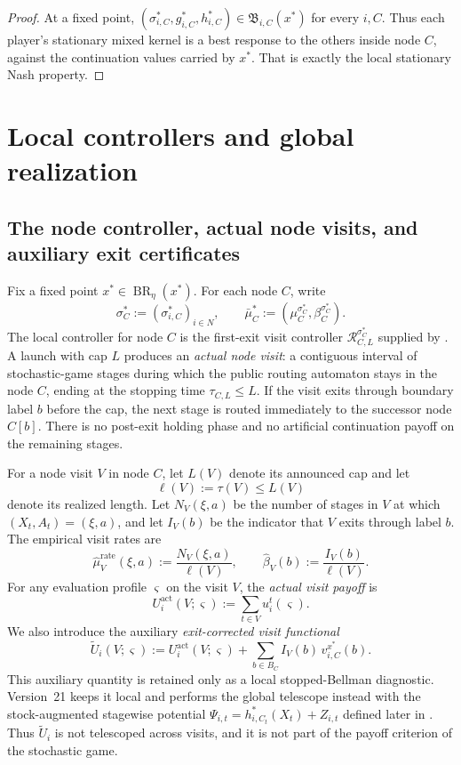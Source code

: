 \documentclass[12pt]{article}
\theoremstyle{definition}
\newcommand{\1}{\mathbf{1}}
\DeclareMathOperator{\BR}{BR}
\begin{document}
\begin{proof}
At a fixed point,
$(\sigma_{i,C}^*,g_{i,C}^*,h_{i,C}^*)\in\mathfrak B_{i,C}(x^*)$ for every $i,C$.
Thus each player's stationary mixed kernel is a best response to the others inside
node $C$, against the continuation values carried by $x^*$. That is exactly the
local stationary Nash property.
\end{proof}


\section{Local controllers and global realization}
\label{sec:realization}

\subsection{The node controller, actual node visits, and auxiliary exit certificates}

Fix a fixed point $x^*\in\BR_\eta(x^*)$. For each node $C$, write
\[
\sigma_C^*:=(\sigma_{i,C}^*)_{i\in N},
\qquad
\bar\mu_C^*:=(\mu_C^{\sigma_C^*},\beta_C^{\sigma_C^*}).
\]
The local controller for node $C$ is the first-exit visit controller
$\mathcal R_{C,L}^{\sigma_C^*}$ supplied by . A
launch with cap $L$ produces an \emph{actual node visit}: a contiguous interval
of stochastic-game stages during which the public routing automaton stays in the
node $C$, ending at the stopping time $\tau_{C,L}\le L$. If the visit exits
through boundary label $b$ before the cap, the next stage is routed immediately
to the successor node $C[b]$. There is no post-exit holding phase and no
artificial continuation payoff on the remaining stages.

For a node visit $V$ in node $C$, let $L(V)$ denote its announced cap and let
\[
\ell(V):=\tau(V)\le L(V)
\]
denote its realized length. Let $N_V(\xi,a)$ be the number of stages in $V$ at
which $(X_t,A_t)=(\xi,a)$, and let $I_V(b)$ be the indicator that $V$ exits
through label $b$. The empirical visit rates are
\[
\widehat\mu_V^{\mathrm{rate}}(\xi,a):=\frac{N_V(\xi,a)}{\ell(V)},
\qquad
\widehat\beta_V(b):=\frac{I_V(b)}{\ell(V)}.
\]
For any evaluation profile $\varsigma$ on the visit $V$, the \emph{actual visit
payoff} is
\begin{equation}
\label{eq:visit-actual-payoff}
U_i^{\mathrm{act}}(V;\varsigma)
:=
\sum_{t\in V} u_i^t(\varsigma).
\end{equation}
We also introduce the auxiliary \emph{exit-corrected visit functional}
\begin{equation}
\label{eq:visit-aux-payoff}
\widetilde U_i(V;\varsigma)
:=
U_i^{\mathrm{act}}(V;\varsigma)
+
\sum_{b\in B_C}I_V(b)\,v_{i,C}^{x^*}(b).
\end{equation}
This auxiliary quantity is retained only as a local stopped-Bellman diagnostic.
Version~21 keeps it local and performs the global telescope instead with the
stock-augmented stagewise potential
$\Psi_{i,t}=h_{i,C_t}^*(X_t)+Z_{i,t}$ defined later in
. Thus $\widetilde U_i$ is not telescoped across visits,
and it is not part of the payoff criterion of the stochastic game.
\end{document}
